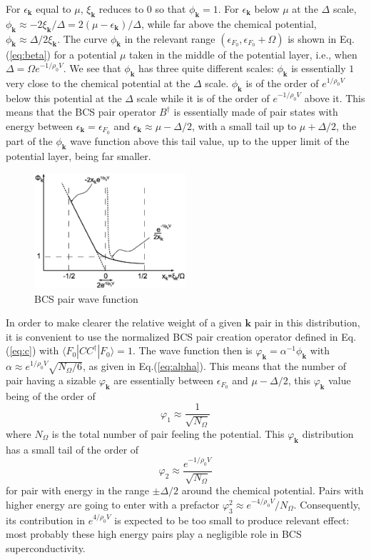 \documentclass[aps,prb,preprint,groupedaddress,amsmath]{revtex4-1}
\newcommand{\vk}{\ensuremath{\mathbf{k}}}
\newcommand{\dg}{\ensuremath{\dagger}}
\begin{document}
For $\epsilon_\vk$ equal to $\mu$, $\xi_\vk$ reduces to $0$ so that $\phi_\vk=1$.  For $\epsilon_\vk$ below $\mu$ at the $\Delta$ scale, $\phi_\vk\approx-2\xi_\vk/\Delta=2(\mu-\epsilon_\vk)/\Delta $, while far above the chemical potential, $\phi_\vk\approx\Delta/2\xi_\vk$. The curve $\phi_\vk$ in the relevant range $(\epsilon_{F_0},\epsilon_{F_0}+\Omega)$ is shown in Eq.(\ref{eq:beta}) for a potential $\mu$ taken in the middle of the potential layer, i.e., when $\Delta=\Omega{}e^{-1/\rho_0V}$.  We see that $\phi_\vk$ has three quite different scales: $\phi_\vk$ is essentially $1$ very close to the chemical potential at the $\Delta$ scale. $\phi_\vk$ is of the order of $e^{1/\rho_0V}$ below this potential at the $\Delta$ scale while it is of the order of $e^{-1/\rho_0V}$ above it.  This means that the BCS pair operator $B^\dg$ is essentially made of pair states with energy between $\epsilon_\vk=\epsilon_{F_0}$ and $\epsilon_\vk\approx\mu-\Delta/2$, with a small tail up to  $\mu+\Delta/2$, the part of the $\phi_\vk$ wave function above this tail value, up to the upper limit of the potential layer, being far smaller. 
 \begin{figure}[htb]
 \includegraphics[width=0.5\textwidth]{BcsWF}
 \caption{BCS pair wave function\label{}}
 \end{figure}

In order to make clearer the relative weight of a given $\vk$ pair in this distribution, it is convenient to use the normalized BCS pair creation operator defined in Eq. (\ref{eq:c})
with $\langle{}F_0|CC^\dg|F_0\rangle=1$. The wave function then is $\varphi_\vk=\alpha^{-1}\phi_\vk$ with $\alpha\approx{}e^{1/\rho_0V}\sqrt{N_\Omega/6}$, as given in Eq.(\ref{eq:alpha}). This means that the number of pair having a sizable $\varphi_\vk$ are essentially between $\epsilon_{F_0}$ and  $\mu-\Delta/2$, this $\varphi_\vk$ value being of the order of 
\begin{equation}
 \varphi_1\approx\frac{1}{\sqrt{N_\Omega}}
\end{equation}
where $N_\Omega$ is the total number of pair feeling the potential.  This $\varphi_\vk$ distribution has a small tail of the order of 
\begin{equation}
  \varphi_2\approx\frac{e^{-1/\rho_0V}}{\sqrt{N_\Omega}}
\end{equation}
for pair with energy in the range $\pm\Delta/2$ around the chemical potential.  Pairs with higher energy are going to enter with a prefactor $\varphi_3^2\approx{}e^{-4/\rho_0V}/N_\Omega$. Consequently, its contribution in $e^{4/\rho_0V}$ is expected to be too small to produce relevant effect: most probably these high energy pairs play a negligible role in BCS superconductivity. 
\end{document}
